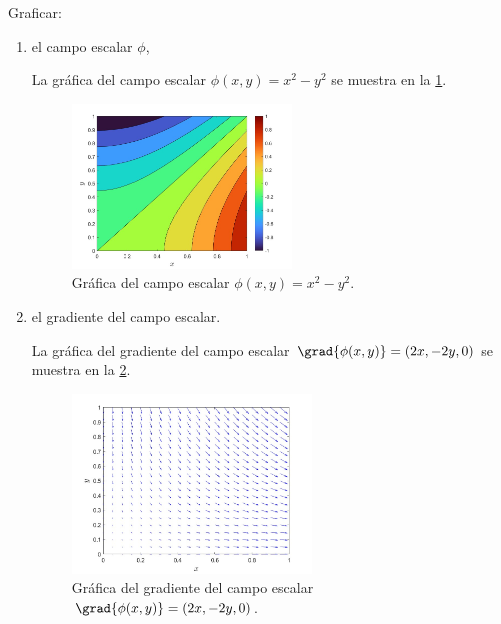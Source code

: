 \documentclass[./../main.tex]{subfiles}
\begin{document}
    \pagebreak
    Graficar:
    \begin{enumerate}[label=\arabic*), resume]
        \item el campo escalar \(\phi\),
        
        La gráfica del campo escalar \(\phi(x, y) = x^{2} - y^{2}\) se muestra en la \cref{fig:scalar-field}.

        \begin{figure}[htb]
            \centering
            \includegraphics[width=0.55\textwidth]{campo-escalar}
            \caption{Gráfica del campo escalar \(\phi(x, y) = x^{2} - y^{2}\).}
            \label{fig:scalar-field}
        \end{figure}
        
        \item el gradiente del campo escalar.
        
        La gráfica del gradiente del campo escalar \(\grad{{\phi(x, y)}} = (2x, -2y, 0)\) se muestra en la \cref{fig:gradient-scalar-field}.

        \begin{figure}[htb]
            \centering
            \includegraphics[width=0.6\textwidth]{gradiente-campo-escalar}
            \caption{Gráfica del gradiente del campo escalar \(\grad{{\phi(x, y)}} = (2x, -2y, 0)\).}
            \label{fig:gradient-scalar-field}
        \end{figure}
    \end{enumerate}
\end{document}
